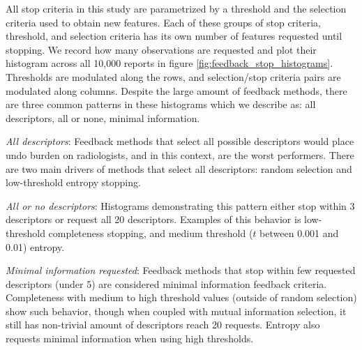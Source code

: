 All stop criteria in this study are parametrized by a threshold and the selection criteria used to obtain new features. Each of these groups of stop criteria, threshold, and selection criteria has its own number of features requested until stopping. We record how many observations are requested and plot their histogram across all 10,000 reports in figure \ref{fig:feedback_stop_histograms}. Thresholds are modulated along the rows, and selection/stop criteria pairs are modulated along columns. Despite the large amount of feedback methods, there are three common patterns in these histograms which we describe as: all descriptors, all or none, minimal information.

\emph{All descriptors}:
Feedback methods that select all possible descriptors would place undo burden on radiologists, and in this context, are the worst performers. There are two main drivers of methods that select all descriptors: random selection and low-threshold entropy stopping. 

\emph{All or no descriptors}:
Histograms demonstrating this pattern either stop within 3 descriptors or request all 20 descriptors. Examples of this behavior is low-threshold completeness stopping, and medium threshold ($t$ between 0.001 and 0.01) entropy.

\emph{Minimal information requested}:
Feedback methods that stop within few requested descriptors (under 5) are considered minimal information feedback criteria. Completeness with medium to high threshold values (outside of random selection) show such behavior, though when coupled with mutual information selection, it still has non-trivial amount of descriptors reach 20 requests. Entropy also requests minimal information when using high thresholds.
 

